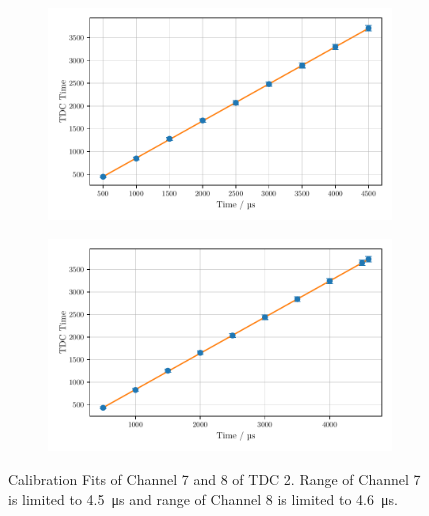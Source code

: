 \begin{figure}
    \centering
    \begin{subfigure}[b]{0.48\textwidth}
        \includegraphics[width=\textwidth]{plots/tdc14.pdf}
    \end{subfigure}\hfill
    \begin{subfigure}[b]{0.48\textwidth}
        \includegraphics[width=\textwidth]{plots/tdc15.pdf}
    \end{subfigure}
    \caption{Calibration Fits of Channel 7 and 8 of TDC 2. 
    Range of Channel 7 is limited to \SI{4.5}{\micro\second} and range of Channel 8 is limited to \SI{4.6}{\micro\second}.}
    \label{fig:tdc1415}
\end{figure}